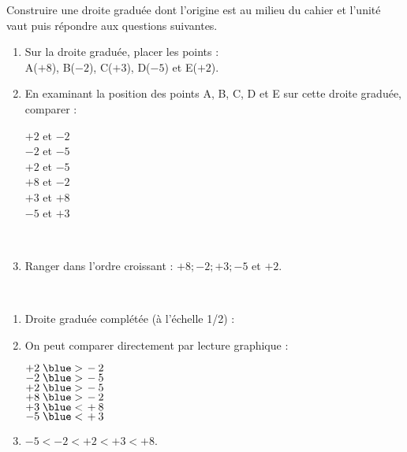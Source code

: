 \begin{colonne*exercice}
\begin{exercice} %
   Construire une droite graduée dont l'origine est au milieu du cahier et l'unité vaut  puis répondre aux questions suivantes.
   \begin{enumerate}
      \item Sur la droite graduée, placer les points : \\
         A($+8$), B($-2$), C($+3$), D($-5$) et E($+2$).
      \item En examinant la position des points A, B, C, D et E sur cette droite graduée, comparer : \\ [-9mm]
         \begin{multicols}{3}
            $+2$ et $-2$ \\ \smallskip
            $-2$ et $-5$ \\ \smallskip
            $+2$ et $-5$ \\
            $+8$ et $-2$ \\
            $+3$ et $+8$ \\
            $-5$ et $+3$
         \end{multicols}
         \ \\ [-15mm]
      \item Ranger dans l'ordre croissant : $+8 ; -2 ; +3 ; -5$ et $+2$.
   \end{enumerate}
\end{exercice}

\begin{corrige}
   \ \\ [-5mm]
   \begin{enumerate}
      \item Droite graduée complétée (à l'échelle 1/2) : \\ [2mm]
      \hspace*{-10mm} 
      \item On peut comparer directement par lecture graphique :
         \begin{multicols}{3}
            $+2 \; {\blue >} \, -2$ \\ \smallskip
            $-2  \; {\blue >} \, -5$ \\ \smallskip
            $+2 \; {\blue >} \, -5$ \\
            $+8 \; {\blue >} \, -2$ \\
            $+3 \; {\blue <} \, +8$ \\
            $-5 \; {\blue <} \, +3$
         \end{multicols}
         \vspace*{-3mm}
      \item \blue$-5<-2<+2<+3<+8$.
   \end{enumerate}
\end{corrige}


\end{colonne*exercice}
